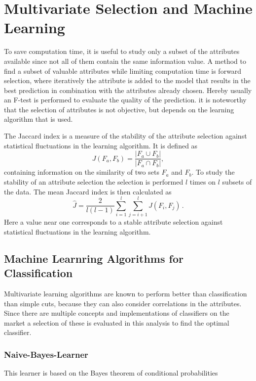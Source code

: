 \section{Multivariate Selection and Machine Learning}
To save computation time, it is useful to study only a subset of the attributes available since not all of them contain the same information value. A method to find a subset of valuable attributes while limiting computation time is forward selection, where iteratively the attribute is added to the model that results in the best prediction in combination with the attributes already chosen. Hereby usually an F-test is performed to evaluate the quality of the prediction. it is noteworthy that the selection of attributes is not objective, but depends on the learning algorithm that is used.

The Jaccard index is a measure of the stability of the attribute selection against statistical fluctuations in the learning algorithm. It is defined as
\begin{equation*}
    J \left(F_a, F_b \right) = \frac{|F_a \cup F_b|}{|F_a \cap F_b|},
\end{equation*}
containing information on the similarity of two sets $F_a$ and $F_b$.
To study the stability of an attribute selection the selection is performed $l$ times on $l$ subsets of the data. The mean Jaccard index is then calculated as
\begin{equation*}
    \hat{J} = \frac{2}{l \left(l - 1 \right)} \sum\limits_{i = 1}^{l}\sum\limits_{j = i+1}^{l} J\left(F_i, F_j \right) \, .
\end{equation*}
Here a value near one corresponds to a stable attribute selection against statistical fluctuations in the learning algorithm.\\

\subsection{Machine Learnring Algorithms for Classification}
Multivariate learning algorithms are known to perform better than classification than simple cuts, because they can also consider correlations in the attributes. Since there are multiple concepts and implementations of classifiers on the market a selection of these is evaluated in this analysis to find the optimal classifier.

\subsubsection*{Naive-Bayes-Learner}
This learner is based on the Bayes theorem of conditional probabilities

